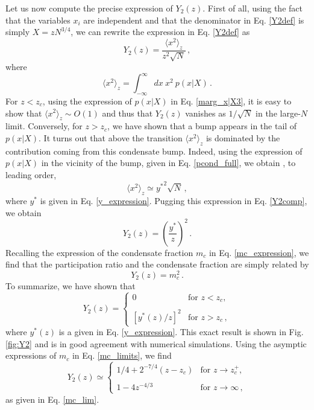 \documentclass[aps,pre,twocolumn,superscriptaddress,showpacs]{revtex4-1}
\begin{document}
Let us now compute the precise expression of $Y_2(z)$. First of all, using the fact that the variables $x_i$ are independent and that the denominator in Eq. \eqref{Y2def} is simply $X=zN^{3/4}$, we can rewrite the expression in Eq. \eqref{Y2def} as
\begin{equation}
Y_2(z)=\frac{ \langle x^2 \rangle_z}{z^2\sqrt{N}}\,,
\label{Y2comp}
\end{equation}
where 
\begin{equation}
\langle x^2\rangle_z=\int_{-\infty}^{\infty}dx~x^2~p(x|X)\,.
\end{equation}
For $z<z_c$, using the expression of $p(x|X)$ in Eq. \eqref{marg_x|X3}, it is easy to show that $\langle x^2\rangle_z\sim O(1)$ and thus that $Y_2(z)$ vanishes as $1/\sqrt{N}$ in the large-$N$ limit. Conversely, for $z>z_c$, we have shown that a bump appears in the tail of $p(x|X)$. It turns out that above the transition $\langle x^2\rangle_z$ is dominated by the contribution coming from this condensate bump. Indeed, using the expression of $p(x|X)$ in the vicinity of the bump, given in Eq. \eqref{pcond_full}, we obtain , to leading order,
\begin{equation}
\langle x^2\rangle_z\simeq {y^*}^2\sqrt{N}\,,
\end{equation}
where $y^*$ is given in Eq. \eqref{y_expression}. Pugging this expression in Eq. \eqref{Y2comp}, we obtain
\begin{equation}
Y_2(z)=\left(\frac{y^*}{z}\right)^2\,.
\end{equation}
Recalling the expression of the condensate fraction $m_c$ in Eq. \eqref{mc_expression}, we find that the participation ratio and the condensate fraction are simply related by
\begin{equation}
Y_2(z)=m_c^2\,.
\end{equation}
To summarize, we have shown that
\begin{equation}
Y_2(z)=\begin{cases}
0 & \text{for } z<z_c,\\
\\
\left[y^*(z)/z\right]^2 & \text{for } z>z_c\,,
\end{cases}
\end{equation}
where $y^*(z)$ is a given in Eq. \eqref{y_expression}. This exact result is shown in Fig. \eqref{fig:Y2} and is in good agreement with numerical simulations. Using the asymptic expressions of $m_c$ in Eq. \eqref{mc_limits}, we find 
\begin{equation}
Y_2(z)\simeq\begin{cases}
1/4+2^{-7/4}(z-z_c) & \text{for } z\to z_c^+,\\
\\
1-4 z^{-4/3} & \text{for } z\to\infty\,,
\end{cases}
\end{equation}
as given in Eq. \eqref{mc_lim}.
\end{document}
